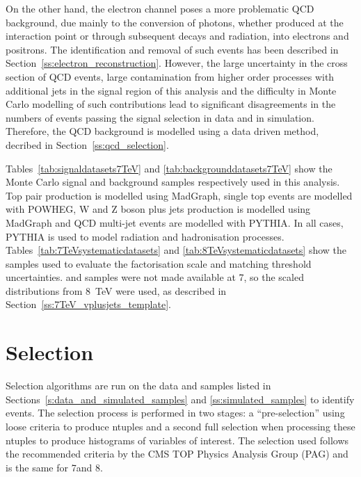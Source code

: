 On the other hand, the electron channel poses a more problematic QCD background, due mainly to the conversion
of photons, whether produced at the interaction point or through subsequent decays and radiation, into
electrons and positrons. The identification and removal of such events has been described in
Section~\ref{ss:electron_reconstruction}. However, the large uncertainty in the cross section of QCD events,
large contamination from higher order processes with additional jets in the signal region of this analysis and
the difficulty in Monte Carlo modelling of such contributions lead to significant disagreements in the numbers
of events passing the signal selection in data and in simulation. Therefore, the QCD background is
modelled using a data driven method, decribed in Section~\ref{ss:qcd_selection}.

Tables~\ref{tab:signaldatasets7TeV} and \ref{tab:backgrounddatasets7TeV} show the Monte Carlo signal and
background samples respectively used in this analysis. Top pair production is modelled using MadGraph, single
top events are modelled with POWHEG, W and Z boson plus jets production is modelled using MadGraph and QCD
multi-jet events are modelled with PYTHIA. In all cases, PYTHIA is used to model radiation and hadronisation
processes. Tables~\ref{tab:7TeVsystematicdatasets} and \ref{tab:8TeVsystematicdatasets} show the samples used
to evaluate the factorisation scale and matching threshold uncertainties. \WpJets and \ZpJets samples were not made available at 7\TeV, so the
scaled distributions from \SI{8}{\TeV} were used, as described in Section~\ref{ss:7TeV_vplusjets_template}.








\section{Selection}
\label{s:selection}
Selection algorithms are run on the data and samples listed in Sections~\ref{s:data_and_simulated_samples} and
\ref{ss:simulated_samples} to identify \ttbar events. The selection process is performed in two stages: a
``pre-selection'' using loose criteria to produce ntuples and a second full selection when processing these
ntuples to produce histograms of variables of interest. The selection used follows the recommended criteria by
the CMS TOP Physics Analysis Group (PAG) and is the same for 7\TeV and 8\TeV.

